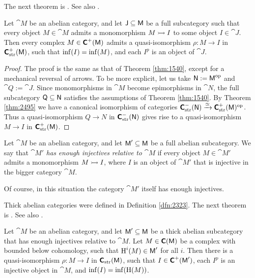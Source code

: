 The next theorem is \cite[Lemma I.4.6(1)]{RD}. See also 
\cite[Proposition 1.7.7(i)]{KaSc1}. 

\begin{thm} \label{thm:1630}
Let $\cat{M}$ be an abelian category, and let $\operatorname{\mathsf{J}} \subseteq \operatorname{\mathsf{M}}$ be a
full subcategory such that every object $M \in \cat{M}$ admits a 
monomorphism $M \rightarrowtail I$ to some object $I \in \cat{J}$. Then every complex 
$M \in \operatorname{\boldsymbol{\mathsf{C}}}^{+}(\operatorname{\mathsf{M}})$ 
admits a quasi-isomorphism $\rho : M \to  I$ in 
$\boldsymbol{\mathsf{C}}^+_{\mathrm{str}}(\operatorname{\mathsf{M}})$,
such that $\operatorname{inf}(I) = \operatorname{inf}(M)$,
and each $I^p$ is an object of $\cat{J}$.
\end{thm}

\begin{proof}
The proof is the same as that of Theorem \ref{thm:1540}, except for a 
mechanical reversal of arrows. To be more explicit, let us
take $\operatorname{\mathsf{N}} := \operatorname{\mathsf{M}}^{\mathrm{op}}$ and $\cat{Q} := \cat{J}$.
Since monomorphisms in $\cat{M}$ become epimorphisms in $\cat{N}$, the 
full subcategory $\operatorname{\mathsf{Q}} \subseteq \operatorname{\mathsf{N}}$ satisfies the 
assumptions of Theorem \ref{thm:1540}. By Theorem \ref{thm:2495} we have a 
canonical isomorphism of categories 
$\operatorname{\boldsymbol{\mathsf{C}}}^{-}_{\mathrm{str}}(\operatorname{\mathsf{N}}) \xrightarrow{\simeq} 
\boldsymbol{\mathsf{C}}^+_{\mathrm{str}}(\operatorname{\mathsf{M}})^{\mathrm{op}}$. 
Thus a quasi-isomorphism $Q \to N$ in 
$\operatorname{\boldsymbol{\mathsf{C}}}^{-}_{\mathrm{str}}(\operatorname{\mathsf{N}})$
gives rise to a quasi-isomorphism $M \to I$ in 
$\operatorname{\boldsymbol{\mathsf{C}}}^{+}_{\mathrm{str}}(\operatorname{\mathsf{M}})$.
\end{proof}

\begin{dfn} \label{dfn:2880}
Let $\cat{M}$ be an abelian category, and let $\operatorname{\mathsf{M}}' \subseteq \operatorname{\mathsf{M}}$ be a 
full abelian subcategory. 
We say that {\em $\cat{M}'$ has enough injectives relative to $\cat{M}$} 
if every object $M \in \cat{M}'$ admits a monomorphism 
$M \rightarrowtail I$, where $I$ is an object of $\cat{M}'$ that is injective in 
the bigger category $\cat{M}$.
\end{dfn}

Of course, in this situation the category $\cat{M}'$ itself has enough 
injectives. 

Thick abelian categories were defined in Definition \ref{dfn:2323}. 
The next theorem is \cite[Lemma I.4.6(3)]{RD}. See also 
\cite[Proposition 1.7.11]{KaSc1}. 

\begin{thm} \label{thm:2880}
Let $\cat{M}$ be an abelian category, and let $\operatorname{\mathsf{M}}' \subseteq \operatorname{\mathsf{M}}$ be a 
thick abelian subcategory that has enough injectives relative to $\cat{M}$.
Let $M \in \boldsymbol{\mathsf{C}}(\operatorname{\mathsf{M}})$ be a complex with bounded below cohomology, 
such that $\operatorname{H}^i(M) \in \operatorname{\mathsf{M}}'$ for all $i$.
Then there is a quasi-isomorphism $\rho : M \to I$ in 
$\boldsymbol{\mathsf{C}}_{\mathrm{str}}(\operatorname{\mathsf{M}})$, such that
$I \in \boldsymbol{\mathsf{C}}^+(\operatorname{\mathsf{M}}')$, each $I^p$ is an injective object in 
$\cat{M}$, and $\operatorname{inf}(I) = \operatorname{inf}(\operatorname{H}(M))$. 
\end{thm}

